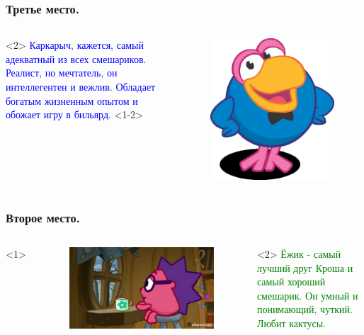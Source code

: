 \documentclass[roman, 12pt]{beamer}
\begin{document}
	\begin{frame}
		\frametitle{Третье место.}
		
		\begin{columns}
			<2>
				\textcolor{blue}{Каркарыч, кажется, самый адекватный из всех смешариков. Реалист, но мечтатель, он интеллегентен и вежлив. Обладает богатым жизненным опытом и обожает игру в бильярд.}
			<1-2>
				\begin{figure}
					\includegraphics[width=0.55\linewidth]{images/karkarich}
				\end{figure}
			\end{columns}		
		
	\end{frame}
			
	\begin{frame}
		\frametitle{Второе место.}
		
			\begin{columns}
			\column{0.5\textwidth}<1>
				\begin{figure}
					\includegraphics[width=0.8\linewidth]{images/ezhik}
				\end{figure}
			\column{0.7\textwidth}<2>
				\textcolor{green}{Ёжик - самый лучший друг Кроша и самый хороший смешарик. Он умный и понимающий, чуткий. Любит кактусы.}
			\end{columns}
		
		\end{frame}
	
\end{document}
